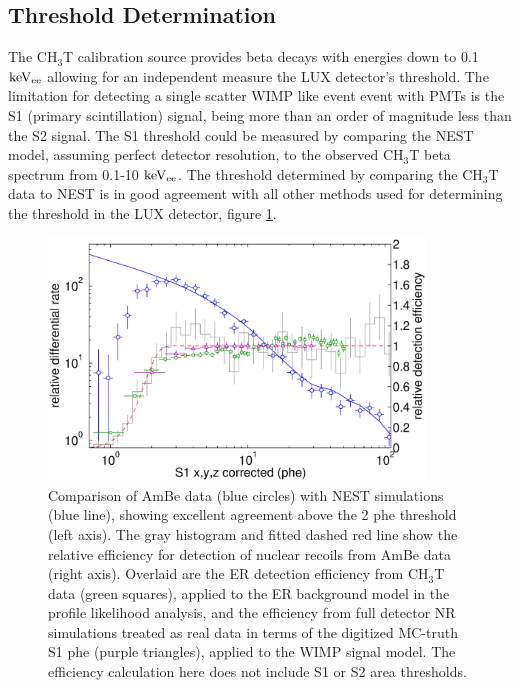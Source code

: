 

\subsection{Threshold Determination}

The CH$_3$T calibration source provides beta decays with energies down to 0.1 $\rm keV_{ee}$ allowing for an independent measure the LUX detector's threshold. The limitation for detecting a single scatter WIMP like event event with PMTs is the S1 (primary scintillation) signal, being more than an order of magnitude less than the S2 signal. The S1 threshold could be measured by comparing the NEST model, assuming perfect detector resolution, to the observed CH$_3$T beta spectrum from 0.1-10 $\rm keV_{ee}$. The threshold determined by comparing the CH$_3$T data to NEST is in good agreement with all other methods used for determining the threshold in the LUX detector, figure \ref{fig:S1_Thresh}. 


\begin{figure}[h!]\centering
\includegraphics[width=100mm]{fig/Triritium_S1_Threshold_2013_PRL.eps}
\caption{Comparison of AmBe data (blue circles) with NEST simulations (blue line), showing excellent agreement above the 2 phe threshold (left axis). The gray histogram and fitted dashed red line show the relative efficiency for detection of nuclear recoils from AmBe data (right axis). Overlaid are the ER detection efficiency from CH$_3$T data (green squares), applied to the ER background model in the profile likelihood analysis, and the efficiency from full detector NR simulations treated as real data in terms of the digitized MC-truth S1 phe (purple triangles), applied to the WIMP signal model. The efficiency calculation here does not include S1 or S2 area thresholds. }
\label{fig:S1_Thresh}
\end{figure}


